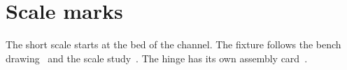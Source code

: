\documentclass{article}
\begin{document}
\section*{Scale marks}
The short scale starts at the bed of the channel.
The fixture follows the bench drawing~\cite{bench} and the scale study~\cite{scale}. The hinge has its own assembly card~\cite{flap}.
\nocite{atlas,guide,lining}

\end{document}
